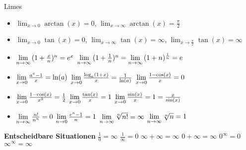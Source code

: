 \begin{Rechenregeln}{Limes}{}
    \begin{itemize}
    \item $\lim_{x\to 0} \arctan(x) = 0$, $\lim_{x\to\infty} \arctan(x) = \frac{\pi}{2}$
    \item $\lim_{x\to 0} \tan(x) = 0$, $\lim_{x\to\infty} \tan(x) = \infty$, $\lim_{x\to\frac{\pi}{2}} \tan(x) = \infty$
    \item $\lim\limits_{n \rightarrow \infty}{(1+\frac{x}{n})^{n}} = e^{x}$ \abstand $\lim\limits_{n \rightarrow \infty}{(1+\frac{1}{n})^{n}} = \lim\limits_{n \rightarrow \infty}{(1+n)^{\frac{1}{n}}} = e$ 
    \item $\lim\limits_{x \rightarrow 0}{\frac{a^{x}-1}{x}} = \ln(a)$ \abstand \(\lim\limits_{x \rightarrow 0}\frac{\log_a(1+x)}{x} = \frac{1}{\ln(a)}\) \abstand \(\lim\limits_{x \rightarrow 0}{\frac{1-\cos(x)}{x}} = 0\) 
    \item \( \lim\limits_{x \rightarrow 0}{\frac{1-\cos(x)}{x^{2}}} = \frac{1}{2} \) \abstand \( \lim\limits_{x \rightarrow 0}{\frac{\tan(x)}{x}} = 1\) \abstand \( \lim\limits_{x \rightarrow 0}{\frac{\sin(x)}{x}} = 1 = \frac{x}{\sin(x)}\) 
    \item \(\lim\limits_{n \rightarrow \infty}{\frac{n!}{n^{n}}} = 0\) \abstand \(\lim\limits_{n \rightarrow 0}{\frac{e^{n} -1}{n}} = 1\) \abstand \(\lim\limits_{n \rightarrow \infty}{\sqrt[n]{n!}} = \infty\) \abstand \(\lim\limits_{n \rightarrow \infty} {\sqrt[n]{n}} = 1\)
    \end{itemize}
    \textbf{Entscheidbare Situationen}
    $\frac{1}{0} = \infty$ \abstand $\frac{1}{\infty} = 0$ \abstand $\infty + \infty = \infty$ 
    \abstand $0 + \infty = \infty$ \abstand $0^{\infty} = 0$ \abstand $\infty^{\infty} = \infty$
\end{Rechenregeln}

